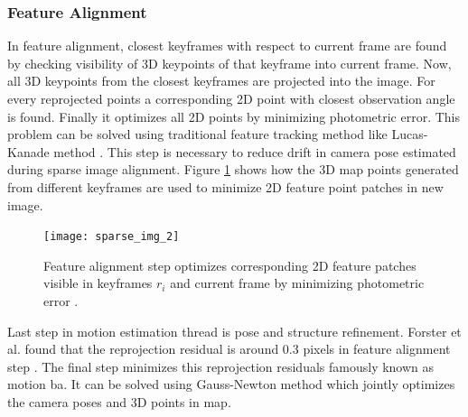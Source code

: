 \subsubsection{Feature Alignment}
In feature alignment, closest keyframes with respect to current frame are found by checking visibility of 3D keypoints of that keyframe into current frame. Now, all 3D keypoints from the closest keyframes are projected into the image. For every reprojected points a corresponding 2D point with closest observation angle is found. Finally it optimizes all 2D points by minimizing photometric error. This problem can be solved using traditional feature tracking method like Lucas-Kanade method \cite{Lucas81}. This step is necessary to reduce drift in camera pose estimated during sparse image alignment. Figure \ref{fig:sparse_img_2} shows how the 3D map points generated from different keyframes are used to minimize 2D feature point patches in new image.\\
\begin{figure}[H]
	\centering
	\texttt{[image: sparse\_img\_2]}
	\caption{Feature alignment step optimizes corresponding 2D feature patches visible in keyframes $ r_{i} $ and current frame by minimizing photometric error \cite{Forster2014ICRA}.}
	\label{fig:sparse_img_2}
\end{figure}
\noindent Last step in motion estimation thread is pose and structure refinement. Forster et al. found that the reprojection residual is around 0.3 pixels in feature alignment step \cite{Forster2014ICRA}. The final step minimizes this reprojection residuals famously known as motion \acrshort{ba}. It can be solved using Gauss-Newton method which jointly optimizes the camera poses and 3D points in map. \\


